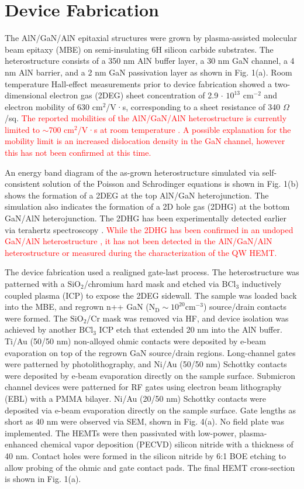 \documentclass[journal]{IEEEtran}
\begin{document}
\section{Device Fabrication}
The AlN/GaN/AlN epitaxial structures were grown by plasma-assisted molecular beam epitaxy (MBE) on semi-insulating 6H silicon carbide substrates. The heterostructure consists of a 350 nm AlN buffer layer, a 30 nm GaN channel, a 4 nm AlN barrier, and a 2 nm GaN passivation layer as shown in Fig. 1(a). Room temperature Hall-effect measurements prior to device fabrication showed a two-dimensional electron gas (2DEG) sheet concentration of 2.9 $\cdot$ $\mathrm{10^{13}}$ $\mathrm{cm^{-2}}$ and electron mobility of 630 $\mathrm{cm^2}$/V·s, corresponding to a sheet resistance of 340 $\Omega$/sq.  \textcolor{red}{The reported mobilities of the AlN/GaN/AlN heterostructure is currently limited to $\sim$700 $\mathrm{cm^2}$/V·s at room temperature \cite{b4,b5,b6,badd}. A possible explanation for the mobility limit is an increased dislocation density in the GaN channel, however this has not been confirmed at this time.}

An energy band diagram of the as-grown heterostructure simulated via self-consistent solution of the Poisson and Schrodinger equations \cite{b9} is shown in Fig. 1(b) shows the formation of a 2DEG at the top AlN/GaN heterojunction. The simulation also indicates the formation of a 2D hole gas (2DHG) at the bottom GaN/AlN heterojunction. The 2DHG has been experimentally detected earlier via terahertz spectroscopy \cite{b10}. \textcolor{red}{While the 2DHG has been confirmed in an undoped GaN/AlN heterostructure \cite{b11}, it has not been detected in the AlN/GaN/AlN heterostructure or measured during the characterization of the QW HEMT.}

The device fabrication used a realigned gate-last process. The heterostructure was patterned with a $\mathrm{SiO_2}$/chromium hard mask and etched via $\mathrm{BCl_3}$ inductively coupled plasma (ICP) to expose the 2DEG sidewall. The sample was loaded back into the MBE, and regrown n++ GaN ($\mathrm{N_D}\sim10^{20} \mathrm{cm^{-3}}$) source/drain contacts were formed. The $\mathrm{SiO_2}$/Cr mask was removed via HF, and device isolation was achieved by another $\mathrm{BCl_3}$ ICP etch that extended 20 nm into the AlN buffer. Ti/Au (50/50 nm) non-alloyed ohmic contacts were deposited by e-beam evaporation on top of the regrown GaN source/drain regions. Long-channel gates were patterned by photolithography, and Ni/Au (50/50 nm) Schottky contacts were deposited by e-beam evaporation directly on the sample surface. Submicron channel devices were patterned for RF gates using electron beam lithography (EBL) with a PMMA bilayer. Ni/Au (20/50 nm) Schottky contacts were deposited via e-beam evaporation directly on the sample surface. Gate lengths as short as 40 nm were observed via SEM, shown in Fig. 4(a). No field plate was implemented. The HEMTs were then passivated with low-power, plasma-enhanced chemical vapor deposition (PECVD) silicon nitride with a thickness of 40 nm. Contact holes were formed in the silicon nitride by 6:1 BOE etching to allow probing of the ohmic and gate contact pads. The final HEMT cross-section is shown in Fig. 1(a).
\end{document}

